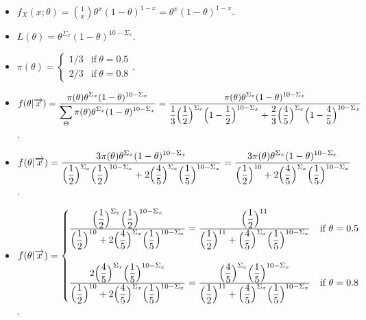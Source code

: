 \documentclass[12pt]{article}
\newcommand{\ds}{\displaystyle}
\begin{document}
\begin{itemize}
    \item $ \ds f_X(x ; \theta) = \binom{1}{x} \theta^{x} (1 - \theta)^{1 - x} = \theta^{x} (1 - \theta)^{1 - x} $. \\
    \item $ \ds L(\theta) = \theta^{\Sigma_{x}} (1 - \theta)^{10 - \Sigma_{x}} $. \\
    \item $ \ds \pi(\theta) = \begin{cases}
        1/3 & \text{if} \ \theta = 0.5 \\
        2/3 & \text{if} \ \theta = 0.8
    \end{cases} $. \\
    \item $ \ds f(\theta | \overrightarrow{x}) = \frac{ \ds \pi(\theta) \theta^{\Sigma_{x}} (1 - \theta)^{10 - \Sigma_{x}} }{ \ds \sum_{\Theta} \pi(\theta) \theta^{\Sigma_{x}} (1 - \theta)^{10 - \Sigma_{x}} } =
    \frac{ \ds \pi(\theta) \theta^{\Sigma_{x}} (1 - \theta)^{10 - \Sigma_{x}} }{ \ds \frac{1}{3} \Bigl( \frac{1}{2} \Bigr)^{\Sigma_{x}} \Bigl( 1 - \frac{1}{2} \Bigr)^{10 - \Sigma_{x}} + \frac{2}{3} \Bigl( \frac{4}{5} \Bigr)^{\Sigma_{x}} \Bigl( 1 - \frac{4}{5} \Bigr)^{10 - \Sigma_{x}} } $. \\
    \item $ \ds f(\theta | \overrightarrow{x}) = \frac{ \ds 3 \pi(\theta) \theta^{\Sigma_{x}} (1 - \theta)^{10 - \Sigma_{x}} }{ \ds \Bigl( \frac{1}{2} \Bigr)^{\Sigma_{x}} \Bigl( \frac{1}{2} \Bigr)^{10 - \Sigma_{x}} + 2 \Bigl( \frac{4}{5} \Bigr)^{\Sigma_{x}} \Bigl( \frac{1}{5} \Bigr)^{10 - \Sigma_{x}} } =
    \frac{ \ds 3 \pi(\theta) \theta^{\Sigma_{x}} (1 - \theta)^{10 - \Sigma_{x}} }{ \ds \Bigl( \frac{1}{2} \Bigr)^{10} + 2 \Bigl( \frac{4}{5} \Bigr)^{\Sigma_{x}} \Bigl( \frac{1}{5} \Bigr)^{10 - \Sigma_{x}} } $. \\  \vspace{2.5mm}
    \item $ \ds f(\theta | \overrightarrow{x}) = \begin{cases}
        \frac{ \ds \Bigl( \frac{1}{2} \Bigr)^{\Sigma_{x}} \Bigl( \frac{1}{2} \Bigr)^{10 - \Sigma_{x}} }{ \ds \Bigl( \frac{1}{2} \Bigr)^{10} + 2 \Bigl( \frac{4}{5} \Bigr)^{\Sigma_{x}} \Bigl( \frac{1}{5} \Bigr)^{10 - \Sigma_{x}} } =
        \frac{ \ds \Bigl( \frac{1}{2} \Bigr)^{11} }{ \ds \Bigl( \frac{1}{2} \Bigr)^{11} + \Bigl( \frac{4}{5} \Bigr)^{\Sigma_{x}} \Bigl( \frac{1}{5} \Bigr)^{10 - \Sigma_{x}} } & \text{if} \ \theta = 0.5 \\
        \ & \ \\
        \frac{ \ds 2 \Bigl( \frac{4}{5} \Bigr)^{\Sigma_{x}} \Bigl( \frac{1}{5} \Bigr)^{10 - \Sigma_{x}} }{ \ds \Bigl( \frac{1}{2} \Bigr)^{10} + 2 \Bigl( \frac{4}{5} \Bigr)^{\Sigma_{x}} \Bigl( \frac{1}{5} \Bigr)^{10 - \Sigma_{x}} } =
        \frac{ \ds \Bigl( \frac{4}{5} \Bigr)^{\Sigma_{x}} \Bigl( \frac{1}{5} \Bigr)^{10 - \Sigma_{x}} }{ \ds \Bigl( \frac{1}{2} \Bigr)^{11} + \Bigl( \frac{4}{5} \Bigr)^{\Sigma_{x}} \Bigl( \frac{1}{5} \Bigr)^{10 - \Sigma_{x}} } & \text{if} \ \theta = 0.8
    \end{cases} $. \\
\end{itemize}
\end{document}
